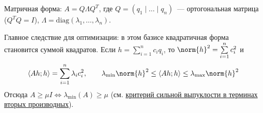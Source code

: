 

\begin{remark}
  Матричная форма: $A = Q \Lambda Q^T$, где $Q = (q_1 \mid \dots \mid q_n)$~--- ортогональная матрица ($Q^T Q = I$), $\Lambda = \mathrm{diag}(\lambda_1, \dots, \lambda_n)$.
\end{remark}

\begin{remark}
  Главное следствие для оптимизации: в этом базисе квадратичная форма становится суммой квадратов. Если $h = \sum\limits_{i=1}^n c_i q_i$, то $\norm{h}^2 = \sum\limits_{i=1}^n c_i^2$ и
  \[
  \left\langle Ah; h \right\rangle = \sum\limits_{i=1}^n \lambda_i c_i^2, \qquad \lambda_{\min} \norm{h}^2 \le \left\langle Ah; h \right\rangle \le \lambda_{\max} \norm{h}^2
  \]
  Отсюда $A \ge \mu I \Leftrightarrow \lambda_{\min}(A) \ge \mu$ (см. \hyperref[note:94DADA28-87E4-4E36-B289-8415BCE750FC]{критерий сильной выпуклости в терминах вторых производных}).
\end{remark}

